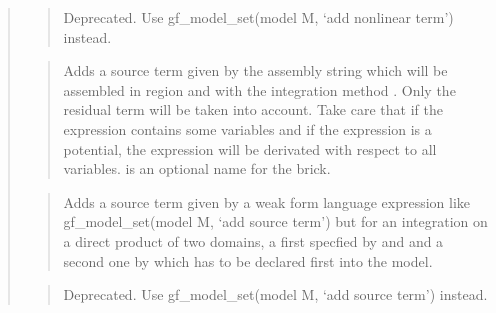 \documentclass[a4paper,11pt,english]{sphinxmanual}
\begin{document}
\begin{quote}
\begin{quote}
Deprecated. Use gf\_model\_set(model M, ‘add nonlinear term’) instead.
\end{quote}

\begin{quote}

Adds a source term given by the assembly string  which will
be assembled in region  and with the integration method .
Only the residual term will be taken into account.
Take care that if the expression contains some variables and if the
expression is a potential, the expression will be
derivated with respect to all variables.
 is an optional name for the brick.
\end{quote}

\begin{quote}

Adds a source term given by a weak form language expression like
gf\_model\_set(model M, ‘add source term’) but for an integration on a direct
product of two domains, a first specfied by  and 
and a second one by  which has to be declared
first into the model.
\end{quote}

\begin{quote}

Deprecated. Use gf\_model\_set(model M, ‘add source term’) instead.
\end{quote}

\begin{quote}


\end{quote}
\end{quote}
\end{document}
